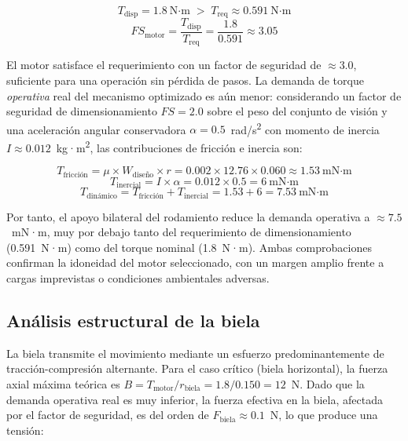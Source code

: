 \begin{equation}
T_{\text{disp}} = 1.8~\text{N·m} \;>\; T_{\text{req}} \approx 0.591~\text{N·m}
\end{equation}
\begin{equation}
FS_{\text{motor}} = \frac{T_{\text{disp}}}{T_{\text{req}}} = \frac{1.8}{0.591} \approx 3.05
\end{equation}

El motor satisface el requerimiento con un factor de seguridad de $\approx 3.0$, suficiente para una operación sin pérdida de pasos. La demanda de torque \emph{operativa} real del mecanismo optimizado es aún menor: considerando un factor de seguridad de dimensionamiento $FS = 2.0$ sobre el peso del conjunto de visión y una aceleración angular conservadora $\alpha = 0.5$~rad/s\textsuperscript{2} con momento de inercia $I \approx 0.012$~kg·m\textsuperscript{2}, las contribuciones de fricción e inercia son:

\begin{equation}
T_{\text{fricción}} = \mu \times W_{\text{diseño}} \times r = 0.002 \times 12.76 \times 0.060 \approx 1.53~\text{mN·m}
\end{equation}
\begin{equation}
T_{\text{inercial}} = I \times \alpha = 0.012 \times 0.5 = 6~\text{mN·m}
\end{equation}
\begin{equation}
T_{\text{dinámico}} = T_{\text{fricción}} + T_{\text{inercial}} = 1.53 + 6 = 7.53~\text{mN·m}
\end{equation}

Por tanto, el apoyo bilateral del rodamiento reduce la demanda operativa a $\approx 7.5$~mN·m, muy por debajo tanto del requerimiento de dimensionamiento (0.591~N·m) como del torque nominal (1.8~N·m). Ambas comprobaciones confirman la idoneidad del motor seleccionado, con un margen amplio frente a cargas imprevistas o condiciones ambientales adversas.

\subsection{Análisis estructural de la biela}\label{subsec:analisis-biela}

La biela transmite el movimiento mediante un esfuerzo predominantemente de tracción-compresión alternante. Para el caso crítico (biela horizontal), la fuerza axial máxima teórica es $B = T_{\text{motor}}/r_{\text{biela}} = 1.8/0.150 = 12$~N. Dado que la demanda operativa real es muy inferior, la fuerza efectiva en la biela, afectada por el factor de seguridad, es del orden de $F_{\text{biela}} \approx 0.1$~N, lo que produce una tensión:

